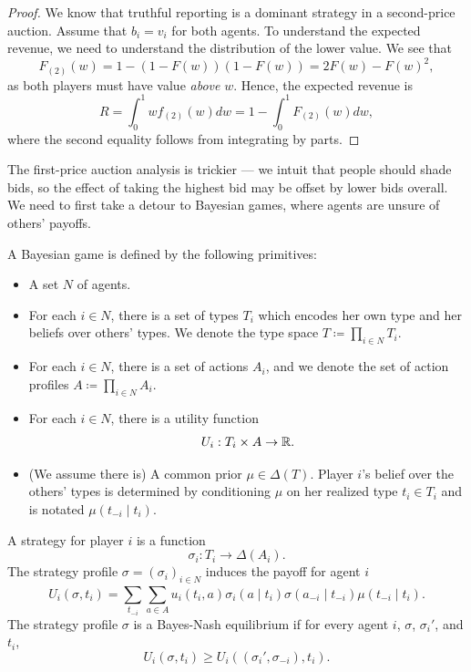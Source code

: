 \begin{proof}
	We know that truthful reporting is a dominant strategy in a second-price auction. Assume that $b_i = v_i$ for both agents.
	To understand the expected revenue, we need to understand the distribution of the lower value.
	We see that \[
		F_{(2)}\left( w \right) = 1- (1-F(w))(1-F(w)) = 2F(w) - F(w)^2
	,\] as both players must have value \emph{above} $w$.
	Hence, the expected revenue is \[
		R = \int_{0}^{1} w f_{(2)}(w)dw = 1- \int_{0}^{1} F_{(2)}(w)dw 	
	,\] 
	where the second equality follows from integrating by parts.
\end{proof}

The first-price auction analysis is trickier --- we intuit that people should shade bids, so the effect of taking the highest bid may be offset by lower bids overall.
We need to first take a detour to Bayesian games, where agents are unsure of others' payoffs.

\begin{definition}
	A Bayesian game is defined by the following primitives:
	\begin{itemize}
		\item A set $N$ of agents.
		\item For each $i \in N$, there is a set of types $T_i$ which encodes her own type and her beliefs over others' types. We denote the type space $T \coloneqq \prod_{i \in N}^{} T_i $.
		\item For each $i \in N$, there is a set of actions $A_i$, and we denote the set of action profiles $A \coloneqq \prod_{i \in N}^{} A_i $.
		\item For each $i \in N$, there is a utility function \[
			U_i: T_i \times A \to \mathbb{R}
		.\] 
		\item (We assume there is) A common prior $\mu \in \Delta(T)$. Player $i$'s belief over the others' types is determined by conditioning $\mu$ on her realized type $t_i \in T_i$ and is notated $\mu\left( t_{-i} \mid t_i \right)$.
	\end{itemize}
	A strategy for player $i$ is a function \[
		\sigma_i : T_i \to \Delta(A_i)
	.\] The strategy profile $\sigma = \left( \sigma_i \right)_{i \in N}$ induces the payoff for agent $i$ \[
		U_i(\sigma, t_i) = \sum\limits_{t_{-i}} \sum\limits_{a \in A}^{} u_i(t_i,a) \sigma_i\left( a\mid t_i \right) \sigma\left( a_{-i} \mid t_{-i} \right) \mu\left( t_{-i}\mid t_i \right)
	.\] 
	The strategy profile $\sigma$ is a Bayes-Nash equilibrium if for every agent $i$, $\sigma$, $\sigma_i'$, and $t_i$, \[
		U_i\left( \sigma,t_i \right) \ge U_i\left( \left( \sigma_i', \sigma_{-i} \right), t_i \right)
	.\] 
\end{definition}

